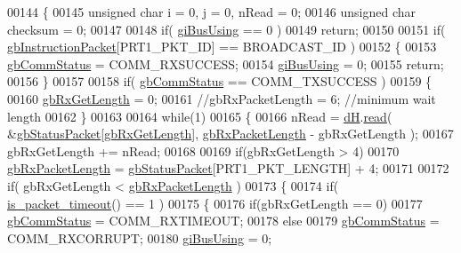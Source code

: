 \begin{DoxyCode}
00144 \{
00145     \textcolor{keywordtype}{unsigned} \textcolor{keywordtype}{char} i = 0, j = 0, nRead = 0;
00146     \textcolor{keywordtype}{unsigned} \textcolor{keywordtype}{char} checksum = 0;
00147 
00148     \textcolor{keywordflow}{if}( \hyperlink{a00003_ad10e0e49f5fef04bf789a89c14cc470a}{giBusUsing} == 0 )
00149         \textcolor{keywordflow}{return};
00150 
00151     \textcolor{keywordflow}{if}( \hyperlink{a00003_afd94dcf01b8e96298727776e222de722}{gbInstructionPacket}[PRT1\_PKT\_ID] == BROADCAST\_ID )
00152     \{
00153         \hyperlink{a00003_a5b603f6bed7ccc595f1f50bd6a6ebbfc}{gbCommStatus} = COMM\_RXSUCCESS;
00154         \hyperlink{a00003_ad10e0e49f5fef04bf789a89c14cc470a}{giBusUsing} = 0;
00155         \textcolor{keywordflow}{return};
00156     \}
00157     
00158     \textcolor{keywordflow}{if}( \hyperlink{a00003_a5b603f6bed7ccc595f1f50bd6a6ebbfc}{gbCommStatus} == COMM\_TXSUCCESS )
00159     \{
00160         \hyperlink{a00003_a9d590ce24791d111c2db9b66be1e046d}{gbRxGetLength} = 0;
00161         \textcolor{comment}{//gbRxPacketLength = 6; //minimum wait length}
00162     \}
00163     
00164     \textcolor{keywordflow}{while}(1)
00165     \{
00166         nRead = \hyperlink{a00003_ae003cc90ada6d7b70eaa4ea9d42d4deb}{dH}.\hyperlink{a00002_ac36331febb2eaa66303af3483795742a}{read}( &\hyperlink{a00003_aa57c86d3bbbeaf5c9d4f6bd00376b04f}{gbStatusPacket}[\hyperlink{a00003_a9d590ce24791d111c2db9b66be1e046d}{gbRxGetLength}], 
      \hyperlink{a00003_a333686e1b5903d16c41df8172b6bd5a8}{gbRxPacketLength} - gbRxGetLength );
00167         gbRxGetLength += nRead;
00168 
00169         \textcolor{keywordflow}{if}(gbRxGetLength > 4)
00170             \hyperlink{a00003_a333686e1b5903d16c41df8172b6bd5a8}{gbRxPacketLength} = \hyperlink{a00003_aa57c86d3bbbeaf5c9d4f6bd00376b04f}{gbStatusPacket}[PRT1\_PKT\_LENGTH] + 4;
00171 
00172         \textcolor{keywordflow}{if}( gbRxGetLength < \hyperlink{a00003_a333686e1b5903d16c41df8172b6bd5a8}{gbRxPacketLength} )
00173         \{
00174             \textcolor{keywordflow}{if}( \hyperlink{a00003_a00d08481ebc4dee19debecf43f888522}{is\_packet\_timeout}() == 1 )
00175             \{
00176                 \textcolor{keywordflow}{if}(gbRxGetLength == 0)
00177                     \hyperlink{a00003_a5b603f6bed7ccc595f1f50bd6a6ebbfc}{gbCommStatus} = COMM\_RXTIMEOUT;
00178                 \textcolor{keywordflow}{else}
00179                     \hyperlink{a00003_a5b603f6bed7ccc595f1f50bd6a6ebbfc}{gbCommStatus} = COMM\_RXCORRUPT;
00180                 \hyperlink{a00003_ad10e0e49f5fef04bf789a89c14cc470a}{giBusUsing} = 0;

\end{DoxyCode}
